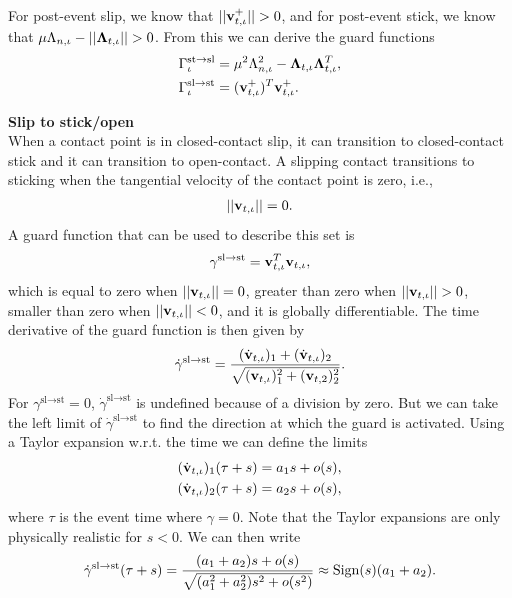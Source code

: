 \documentclass[../DC2019003Bouma.tex]{subfiles}
\begin{document}
For post-event slip, we know that $||\mathbf{v}^+_{t,\iota}|| > 0$, and for post-event stick, we know that  $\mu\Lambda_{n,\iota} - ||\boldsymbol{\Lambda}_{t,\iota}|| > 0$. From this we can derive the guard functions
\begin{align}
\Gamma^{\text{st}\rightarrow\text{sl}}_{\iota} &= \mu^2\Lambda_{n,\iota}^2 - \boldsymbol{\Lambda}_{t,\iota}\boldsymbol{\Lambda}_{t,\iota}^T,\label{eq:slipstick1}\\
\Gamma^{\text{sl}\rightarrow\text{st}}_{\iota} &= (\mathbf{v}^+_{t,\iota})^T\mathbf{v}^+_{t,\iota}.\label{eq:slipstick2}
\end{align}

\textbf{Slip to stick/open}\\
When a contact point is in closed-contact slip, it can transition to closed-contact stick and it can transition to open-contact. A slipping contact transitions to sticking when the tangential velocity of the contact point is zero, i.e.,
\begin{align}
||\mathbf{v}_{t,\iota}|| = 0.
\end{align}
A guard function that can be used to describe this set is
\begin{align}
\gamma^{\text{sl}\rightarrow\text{st}} = \mathbf{v}_{t,\iota}^T\mathbf{v}_{t,\iota},
\end{align}
which is equal to zero when $||\mathbf{v}_{t,\iota}|| = 0$, greater than zero when $||\mathbf{v}_{t,\iota}|| > 0$, smaller than zero when $||\mathbf{v}_{t,\iota}|| < 0$, and it is globally differentiable. The time derivative of the guard function is then given by
\begin{align}
\dot{\gamma}^{\text{sl}\rightarrow\text{st}} = \frac{(\dot{\mathbf{v}}_{t,\iota})_1 + (\dot{\mathbf{v}}_{t,\iota})_2}{\sqrt{(\mathbf{v}_{t,\iota})_1^2 + (\mathbf{v}_{t,2})_2^2}}.
\end{align}
For $\gamma^{\text{sl}\rightarrow\text{st}} = 0$, $\dot{\gamma}^{\text{sl}\rightarrow\text{st}}$ is undefined because of a division by zero. But we can take the left limit of $\dot{\gamma}^{\text{sl}\rightarrow\text{st}}$ to find the direction at which the guard is activated. Using a Taylor expansion w.r.t. the time we can define the limits
\begin{align}
(\dot{\mathbf{v}}_{t,\iota})_1(\tau + s) = a_1 s + o(s),\\
(\dot{\mathbf{v}}_{t,\iota})_2(\tau + s) = a_2 s + o(s),
\end{align}
where $\tau$ is the event time where $\gamma = 0$. Note that the Taylor expansions are only physically realistic for $s < 0$. We can then write
\begin{align}
\dot{\gamma}^{\text{sl}\rightarrow\text{st}}(\tau+s) = \frac{(a_1 + a_2)s + o(s)}{\sqrt{(a_1^2 + a_2^2)s^2 + o(s^2)}} \approx \operatorname{\textnormal{Sign}}(s)(a_1 + a_2).
\end{align}
\end{document}
